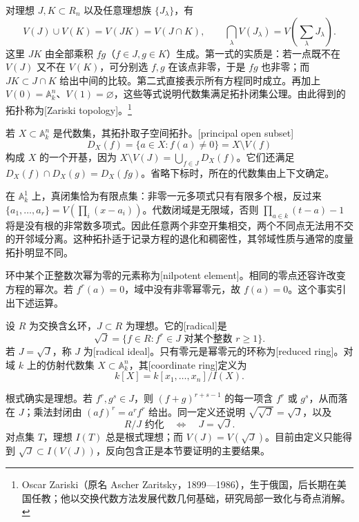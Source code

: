 对理想 \(J,K\subset R_n\) 以及任意理想族 \(\{J_\lambda\}\)，有
\begin{equation}\label{g5:eq:zero-set-operations}
	V(J)\cup V(K)=V(JK)=V(J\cap K),\qquad
	\bigcap_\lambda V(J_\lambda)=V\left(\sum_\lambda J_\lambda\right).
\end{equation}
这里 \(JK\) 由全部乘积 \(fg\)（\(f\in J,g\in K\)）生成。第一式的实质是：若一点既不在 \(V(J)\) 又不在 \(V(K)\)，可分别选 \(f,g\) 在该点非零，于是 \(fg\) 也非零；而 \(JK\subset J\cap K\) 给出中间的比较。第二式直接表示所有方程同时成立。再加上 \(V(0)=\mathbb A_k^n\)、\(V(1)=\varnothing\)，这些等式说明代数集满足拓扑闭集公理。由此得到的拓扑称为[Zariski topology]。\footnote{Oscar Zariski（原名 Ascher Zaritsky，1899—1986），生于俄国，后长期在美国任教；他以交换代数方法发展代数几何基础，研究局部一致化与奇点消解。}

若 \(X\subset\mathbb A_k^n\) 是代数集，其拓扑取子空间拓扑。[principal open subset]
\[
	D_X(f)=\{a\in X:f(a)\ne0\}=X\setminus V(f)
\]
构成 \(X\) 的一个开基，因为 \(X\setminus V(J)=\bigcup_{f\in J}D_X(f)\)。它们还满足 \(D_X(f)\cap D_X(g)=D_X(fg)\)。省略下标时，所在的代数集由上下文确定。

在 \(\mathbb A_k^1\) 上，真闭集恰为有限点集：非零一元多项式只有有限多个根，反过来 \(\{a_1,\ldots,a_r\}=V(\prod_i(x-a_i))\)。代数闭域是无限域，否则 \(\prod_{a\in k}(t-a)-1\) 将是没有根的非常数多项式。因此任意两个非空开集相交，两个不同点无法用不交的开邻域分离。这种拓扑适于记录方程的退化和稠密性，其邻域性质与通常的度量拓扑明显不同。

环中某个正整数次幂为零的元素称为[nilpotent element]。相同的零点还容许改变方程的幂次。若 \(f^r(a)=0\)，域中没有非零幂零元，故 \(f(a)=0\)。这个事实引出下述运算。

\begin{definition}\label{g5:def:radical-coordinate-ring}
	设 \(R\) 为交换含幺环，\(J\subset R\) 为理想。它的[radical]是
	\[
		\sqrt J=\{f\in R:f^r\in J\text{ 对某个整数 }r\geq1\}.
	\]
	若 \(J=\sqrt J\)，称 \(J\) 为[radical ideal]。只有零元是幂零元的环称为[reduced ring]。对域 \(k\) 上的仿射代数集 \(X\subset\mathbb A_k^n\)，其[coordinate ring]定义为
	\[
		k[X]=k[x_1,\ldots,x_n]/I(X).
	\]
\end{definition}

根式确实是理想。若 \(f^r,g^s\in J\)，则 \((f+g)^{r+s-1}\) 的每一项含 \(f^r\) 或 \(g^s\)，从而落在 \(J\)；乘法封闭由 \((af)^r=a^rf^r\) 给出。同一定义还说明 \(\sqrt{\sqrt J}=\sqrt J\)，以及
\[
	R/J\text{ 约化}\quad\Longleftrightarrow\quad J=\sqrt J.
\]
对点集 \(T\)，理想 \(I(T)\) 总是根式理想；而 \(V(J)=V(\sqrt J)\)。目前由定义只能得到 \(\sqrt J\subset I(V(J))\)，反向包含正是本节要证明的主要结果。

